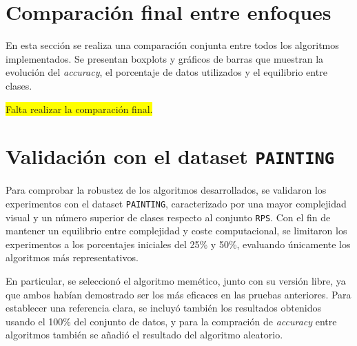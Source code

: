 \section{Comparación final entre enfoques}\label{sec:comparacion-final-enfoques}
En esta sección se realiza una comparación conjunta entre todos los algoritmos implementados.
Se presentan boxplots y gráficos de barras que muestran la evolución del \textit{accuracy}, el porcentaje de datos utilizados y el equilibrio entre clases.


\colorbox{yellow}{Falta realizar la comparación final.}


\section{Validación con el dataset \texttt{PAINTING}}\label{sec:validacion-con-painting}
Para comprobar la robustez de los algoritmos desarrollados, se validaron los experimentos con el dataset \texttt{PAINTING},
caracterizado por una mayor complejidad visual y un número superior de clases respecto al conjunto \texttt{RPS}.
Con el fin de mantener un equilibrio entre complejidad y coste computacional, se limitaron los experimentos a los porcentajes iniciales del 25\% y 50\%,
evaluando únicamente los algoritmos más representativos.

En particular, se seleccionó el algoritmo memético, junto con su versión libre, ya que ambos habían demostrado ser los más eficaces en las pruebas anteriores.
Para establecer una referencia clara, se incluyó también los resultados obtenidos usando el 100\% del conjunto de datos, y para la compración de
\textit{accuracy} entre algoritmos también se añadió el resultado del algoritmo aleatorio.

